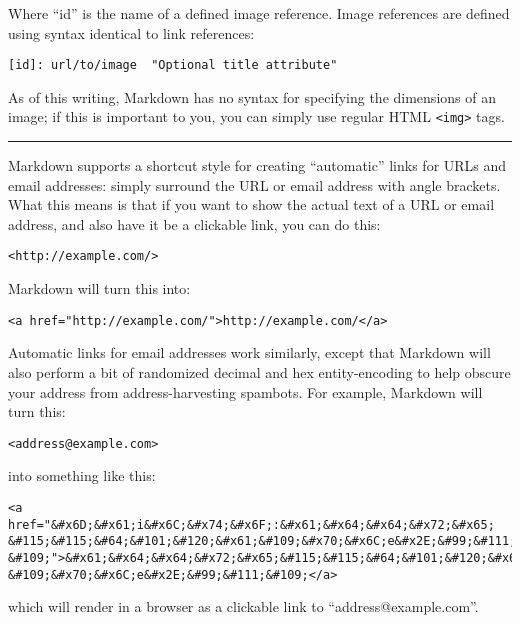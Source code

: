 Where ``id'' is the name of a defined image reference. Image references
are defined using syntax identical to link references:

\begin{verbatim}
[id]: url/to/image  "Optional title attribute"
\end{verbatim}

As of this writing, Markdown has no syntax for specifying the
dimensions of an image; if this is important to you, you can simply
use regular HTML \texttt{<img>} tags.

\begin{center}\rule{3in}{0.4pt}\end{center}

Markdown supports a shortcut style for creating ``automatic'' links for URLs and email addresses: simply surround the URL or email address with angle brackets. What this means is that if you want to show the actual text of a URL or email address, and also have it be a clickable link, you can do this:

\begin{verbatim}
<http://example.com/>
\end{verbatim}

Markdown will turn this into:

\begin{verbatim}
<a href="http://example.com/">http://example.com/</a>
\end{verbatim}

Automatic links for email addresses work similarly, except that
Markdown will also perform a bit of randomized decimal and hex
entity-encoding to help obscure your address from address-harvesting
spambots. For example, Markdown will turn this:

\begin{verbatim}
<address@example.com>
\end{verbatim}

into something like this:

\begin{verbatim}
<a href="&#x6D;&#x61;i&#x6C;&#x74;&#x6F;:&#x61;&#x64;&#x64;&#x72;&#x65;
&#115;&#115;&#64;&#101;&#120;&#x61;&#109;&#x70;&#x6C;e&#x2E;&#99;&#111;
&#109;">&#x61;&#x64;&#x64;&#x72;&#x65;&#115;&#115;&#64;&#101;&#120;&#x61;
&#109;&#x70;&#x6C;e&#x2E;&#99;&#111;&#109;</a>
\end{verbatim}

which will render in a browser as a clickable link to ``address@example.com''.

